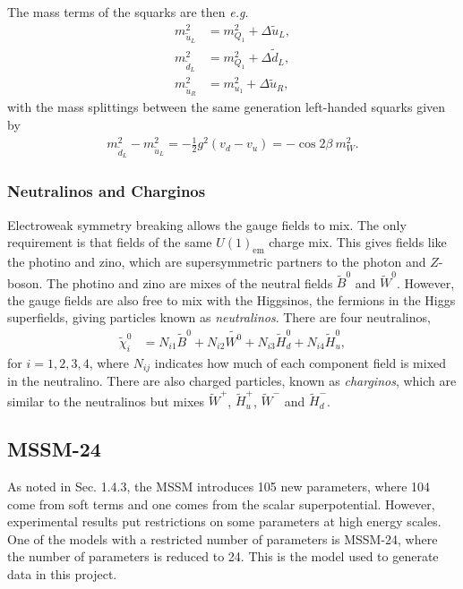 \documentclass[twoside,english]{uiofysmaster}
\begin{document}
{The mass terms of the squarks are then \textit{e.g.}
\begin{align}
m_{\widetilde{u}_L}^2 &= m_{Q_1}^2 + \Delta \widetilde{u}_L,\\
m_{\widetilde{d}_L}^2 &= m_{Q_1}^2 + \Delta \widetilde{d}_L,\\
m_{\widetilde{u}_R}^2 &= m_{u_1}^2 + \Delta \widetilde{u}_R,
\end{align}
with the mass splittings between the same generation left-handed squarks given by
\begin{align}
m_{\widetilde{d}_L}^2 - m_{\widetilde{u}_L}^2 = - \frac{1}{2} g^2(v_d - v_u) = - \cos 2 \beta ~ m_W^2.
\end{align}


\subsubsection{Neutralinos and Charginos}

Electroweak symmetry breaking allows the gauge fields to mix. The only requirement is that fields of the same $U(1)_{\mathrm{em}}$ charge mix. This gives  fields like the photino and zino, which are supersymmetric partners to the photon and $Z$-boson. The photino and zino are mixes of the neutral fields $\widetilde{B}^0$ and $\widetilde{W}^0$. However, the gauge fields are also free to mix with the Higgsinos, the fermions in the Higgs superfields, giving particles known as \textit{neutralinos}. There are four neutralinos,
\begin{align}
\widetilde{\chi}_i^0 &= N_{i1} \widetilde{B}^0 + N_{i2} \widetilde{W^0} + N_{i3} \widetilde{H}_d^0 + N_{i4} \widetilde{H}_u^0,
\end{align}
for $i=1,2,3,4$, where $N_{ij}$ indicates how much of each component field is mixed in the neutralino. There are also charged particles, known as \textit{charginos}, which are similar to the neutralinos but mixes $\widetilde{W}^+$, $\widetilde{H}_u^+$, $\widetilde{W}^-$ and $\widetilde{H}_d^-$.

\subsection{MSSM-24}

As noted in Sec. 1.4.3, the MSSM introduces 105 new parameters, where 104 come from soft terms and one comes from the scalar superpotential. However, experimental results put restrictions on some parameters at high energy scales. One of the models with a restricted number of parameters is MSSM-24, where the number of parameters is reduced to 24. This is the model used to generate data in this project. 

}
\end{document}
